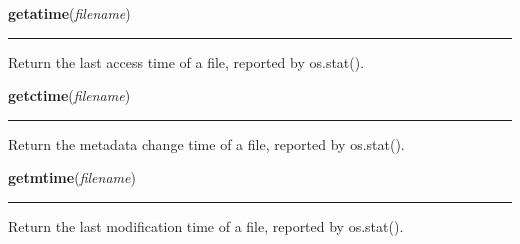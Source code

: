     \label{genericpath:getatime}

    \vspace{0.5ex}

\hspace{.8\funcindent}\begin{boxedminipage}{\funcwidth}

    \raggedright \textbf{getatime}(\textit{filename})

    \vspace{-1.5ex}

    \rule{\textwidth}{0.5\fboxrule}
\setlength{\parskip}{2ex}
    Return the last access time of a file, reported by os.stat().

\setlength{\parskip}{1ex}
    \end{boxedminipage}

    \label{genericpath:getctime}

    \vspace{0.5ex}

\hspace{.8\funcindent}\begin{boxedminipage}{\funcwidth}

    \raggedright \textbf{getctime}(\textit{filename})

    \vspace{-1.5ex}

    \rule{\textwidth}{0.5\fboxrule}
\setlength{\parskip}{2ex}
    Return the metadata change time of a file, reported by os.stat().

\setlength{\parskip}{1ex}
    \end{boxedminipage}

    \label{genericpath:getmtime}

    \vspace{0.5ex}

\hspace{.8\funcindent}\begin{boxedminipage}{\funcwidth}

    \raggedright \textbf{getmtime}(\textit{filename})

    \vspace{-1.5ex}

    \rule{\textwidth}{0.5\fboxrule}
\setlength{\parskip}{2ex}
    Return the last modification time of a file, reported by os.stat().

\setlength{\parskip}{1ex}
    \end{boxedminipage}

